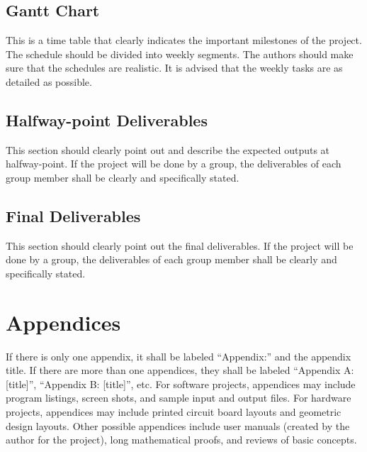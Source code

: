 \documentclass[english]{upeeei}
\begin{document}
\section{Gantt Chart }

This is a time table that clearly indicates the important milestones
of the project. The schedule should be divided into weekly segments.
The authors should make sure that the schedules are realistic. It
is advised that the weekly tasks are as detailed as possible. 

\section{Halfway-point Deliverables}

This section should clearly point out and describe the expected outputs
at halfway-point. If the project will be done by a group, the deliverables
of each group member shall be clearly and specifically stated. 

\section{Final Deliverables}

This section should clearly point out the final deliverables. If the
project will be done by a group, the deliverables of each group member
shall be clearly and specifically stated.

\cleardoublepage{}


\nocite{*}


\cleardoublepage{}

\appendix

\chapter{Appendices}

If there is only one appendix, it shall be labeled \textquotedblleft Appendix:\textquotedblright{}
and the appendix title. If there are more than one appendices, they
shall be labeled \textquotedblleft Appendix A: {[}title{]}\textquotedblright ,
\textquotedblleft Appendix B: {[}title{]}\textquotedblright , etc.
For software projects, appendices may include program listings, screen
shots, and sample input and output files. For hardware projects, appendices
may include printed circuit board layouts and geometric design layouts.
Other possible appendices include user manuals (created by the author
for the project), long mathematical proofs, and reviews of basic concepts.
\end{document}
